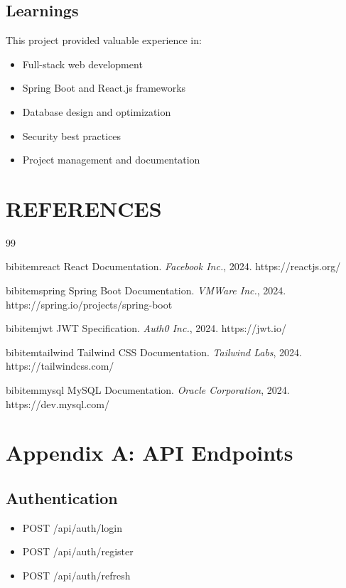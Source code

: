 \documentclass[12pt,a4paper]{report}
\begin{document}
\section{Learnings}
This project provided valuable experience in:

\begin{itemize}
    \item Full-stack web development
    \item Spring Boot and React.js frameworks
    \item Database design and optimization
    \item Security best practices
    \item Project management and documentation
\end{itemize}

\chapter{REFERENCES}

\begin{thebibliography}{99}

bibitem{react} React Documentation. \textit{Facebook Inc.}, 2024. https://reactjs.org/

bibitem{spring} Spring Boot Documentation. \textit{VMWare Inc.}, 2024. https://spring.io/projects/spring-boot

bibitem{jwt} JWT Specification. \textit{Auth0 Inc.}, 2024. https://jwt.io/

bibitem{tailwind} Tailwind CSS Documentation. \textit{Tailwind Labs}, 2024. https://tailwindcss.com/

bibitem{mysql} MySQL Documentation. \textit{Oracle Corporation}, 2024. https://dev.mysql.com/

\end{thebibliography}

\appendix

\chapter{Appendix A: API Endpoints}

\section{Authentication}
\begin{itemize}
    \item POST /api/auth/login
    \item POST /api/auth/register
    \item POST /api/auth/refresh
\end{itemize}
\end{document}
